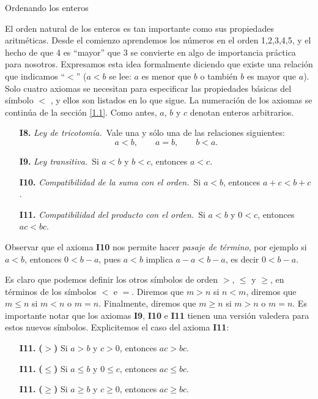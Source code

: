 \documentclass[11pt,spanish,makeidx]{amsbook}
\theoremstyle{definition}
\theoremstyle{remark}
\begin{document}
\begin{section}{Ordenando los enteros}\label{1.2}

El orden natural de los enteros es tan importante como sus propiedades aritméticas. Desde el comienzo aprendemos los números en el orden 1,2,3,4,5, y el hecho de que 4 es ``mayor'' que 3 se convierte en algo de importancia práctica para nosotros. Expresamos esta idea formalmente diciendo que existe una relación que indicamos ``$<$'' ($a < b$ se lee: $a$ es menor que $b$ o también $b$ es mayor que $a$). 
Solo cuatro axiomas se necesitan para especificar las propiedades básicas del símbolo $<$ , y ellos son listados en lo que sigue. La numeración de los axiomas se continúa de la sección \ref{1.1}. Como antes, $a$, $b$ y $c$ denotan enteros arbitrarios. 
\begin{enumerate}
\item[{\bf I8.}] {\em Ley de tricotomía.}\, Vale una y sólo una de las relaciones
siguientes:
$$
a<b, \qquad a = b, \qquad b < a.
$$
\item[{\bf I9.}] {\em Ley transitiva.}\, Si $a< b$ y $b < c$, entonces $a<c$.
\item[{\bf I10.}] {\em Compatibilidad de la suma con el orden.}\, Si $a < b$, entonces $a+c < b+c$. 
\item[{\bf I11.}] {\em Compatibilidad del producto con el orden.}\, Si $a< b$ y $0< c$, entonces $ac < bc$. 
\end{enumerate}

Observar que el axioma {\bf I10} nos permite hacer \textit{pasaje de término}, por ejemplo si $a < b$, entonces $0 < b -a$, pues $a < b$ implica $a - a < b - a$, es decir $0 < b -a$. 

Es claro que podemos definir los otros símbolos de orden $>$, $\le$ y $\ge$, en términos de los símbolos $<$ e $=$. Diremos que $m>n$ si  $n<m$, diremos que $m \le n$ si $m<n$ o $m=n$. Finalmente, diremos que $m \ge n$ si $m > n$ o $m=n$.  Es importante notar que los  axiomas {\bf I9}, {\bf I10} e {\bf I11} tienen una versión valedera para estos nuevos símbolos. Explicitemos el caso  del axioma {\bf I11}:
\begin{enumerate}
\item[{\bf I11.}] {\bf ($>$)} Si $a > b$ y $c>0$, entonces $ac > bc$.
\item[{\bf I11.}] {\bf ($\le$)} Si $a \le b$ y $0 \le c$, entonces $ac \le bc$.
\item[{\bf I11.}] {\bf ($\ge$)} Si $a\ge b$ y $c\ge 0$, entonces $ac \ge bc$.
\end{enumerate}


\end{section}
\end{document}
